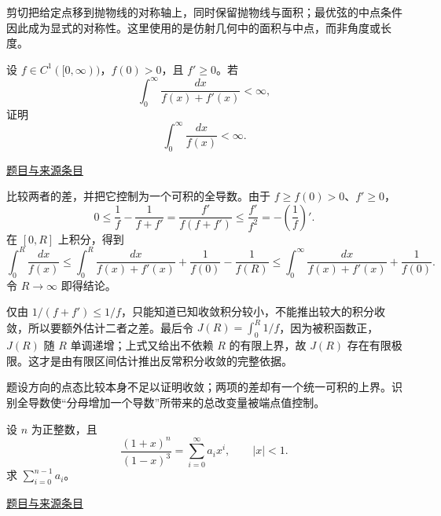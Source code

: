 \documentclass[UTF8,12pt,a4paper,fontset=fandol]{ctexart}
\begin{document}
\begin{remark}[方法与条件]剪切把给定点移到抛物线的对称轴上，同时保留抛物线与面积；最优弦的中点条件因此成为显式的对称性。这里使用的是仿射几何中的面积与中点，而非角度或长度。\end{remark}

\begin{example}[来源序号3]\label{ex:pre04-math:3}\label{pr:pre04-math:3}

设 $f\in C^1([0,\infty))$，$f(0)>0$，且 $f'\ge0$。若
\[
\int_0^\infty\frac{dx}{f(x)+f'(x)}<\infty,
\]
证明
\[
\int_0^\infty\frac{dx}{f(x)}<\infty.
\]

\par\href{https://github.com/lzxcr/cmc-mathematics/blob/64916fa1fdbc3e444a652eca204d5669058ee321/src/problems/preliminary/04/03.md}{题目与来源条目}

\end{example}

\begin{solve}\label{ans:pre04-math:3}

比较两者的差，并把它控制为一个可积的全导数。由于 $f\ge f(0)>0$、$f'\ge0$，
\[
0\le\frac1f-\frac1{f+f'}
=\frac{f'}{f(f+f')}
\le\frac{f'}{f^2}
=-\left(\frac1f\right)'.
\]
在 $[0,R]$ 上积分，得到
\[
\int_0^R\frac{dx}{f(x)}
\le\int_0^R\frac{dx}{f(x)+f'(x)}
+\frac1{f(0)}-\frac1{f(R)}
\le\int_0^\infty\frac{dx}{f(x)+f'(x)}+\frac1{f(0)}.
\]
令 $R\to\infty$ 即得结论。

仅由 $1/(f+f')\le1/f$，只能知道已知收敛积分较小，不能推出较大的积分收敛，所以要额外估计二者之差。最后令 $J(R)=\int_0^R1/f$，因为被积函数正，$J(R)$ 随 $R$ 单调递增；上式又给出不依赖 $R$ 的有限上界，故 $J(R)$ 存在有限极限。这才是由有限区间估计推出反常积分收敛的完整依据。

\end{solve}

\begin{remark}[方法与条件]题设方向的点态比较本身不足以证明收敛；两项的差却有一个统一可积的上界。识别全导数使“分母增加一个导数”所带来的总改变量被端点值控制。\end{remark}

\begin{example}[来源序号5]\label{ex:pre04-math:5}\label{pr:pre04-math:5}

设 $n$ 为正整数，且
\[
\frac{(1+x)^n}{(1-x)^3}=\sum_{i=0}^\infty a_ix^i,
\qquad |x|<1.
\]
求 $\sum_{i=0}^{n-1}a_i$。

\par\href{https://github.com/lzxcr/cmc-mathematics/blob/64916fa1fdbc3e444a652eca204d5669058ee321/src/problems/preliminary/04/05.md}{题目与来源条目}

\end{example}
\end{document}
